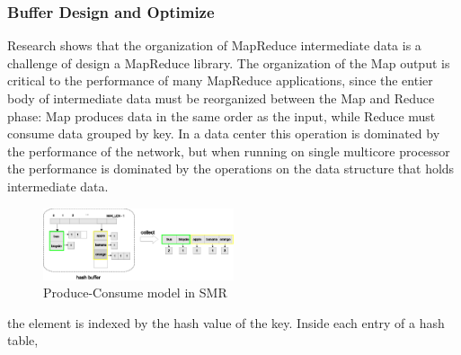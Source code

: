 %



\subsubsection{Buffer Design and Optimize}
Research shows that the organization of MapReduce
intermediate data is a challenge of design a  MapReduce library.
The organization of the Map output is critical to the
performance of many MapReduce applications, 
since the entier body of intermediate data must be
reorganized between the Map and Reduce phase:
Map produces data in the same order as the input,
while Reduce must consume data grouped by key.\cite{mao2010metis}
In a data center this operation is dominated by
the performance of the network, but when running 
on single multicore processor the performance
is dominated by the operations on the data structure
that holds intermediate data.

\begin{figure}[!h!t]  
	\centering
	\includegraphics[width=0.5\textwidth]{eps/dmr_hash_buffer.eps}
	\caption{Produce-Consume model in SMR}
	\label{fig:dmr:hash-buffer}
\end{figure}
the element is indexed by the hash value of the key.
Inside each entry of a hash table,

